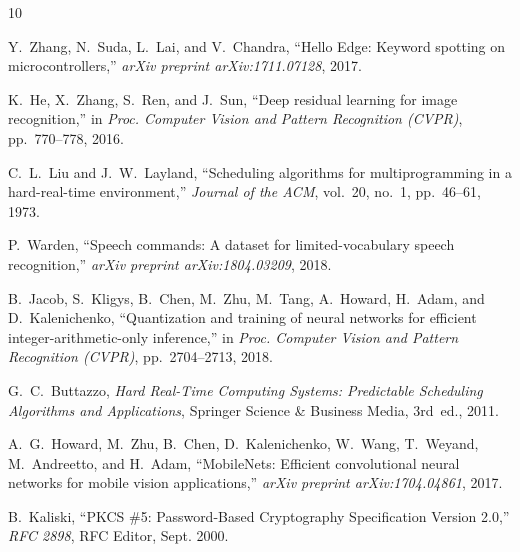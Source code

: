 \documentclass[10pt,twocolumn,letterpaper]{article}
\begin{document}
\begin{thebibliography}{10}
\small

Y.~Zhang, N.~Suda, L.~Lai, and V.~Chandra, ``Hello Edge: Keyword spotting on microcontrollers,'' \textit{arXiv preprint arXiv:1711.07128}, 2017.

K.~He, X.~Zhang, S.~Ren, and J.~Sun, ``Deep residual learning for image recognition,'' in \textit{Proc. Computer Vision and Pattern Recognition (CVPR)}, pp.~770--778, 2016.

C.~L.~Liu and J.~W.~Layland, ``Scheduling algorithms for multiprogramming in a hard-real-time environment,'' \textit{Journal of the ACM}, vol.~20, no.~1, pp.~46--61, 1973.

P.~Warden, ``Speech commands: A dataset for limited-vocabulary speech recognition,'' \textit{arXiv preprint arXiv:1804.03209}, 2018.

B.~Jacob, S.~Kligys, B.~Chen, M.~Zhu, M.~Tang, A.~Howard, H.~Adam, and D.~Kalenichenko, ``Quantization and training of neural networks for efficient integer-arithmetic-only inference,'' in \textit{Proc. Computer Vision and Pattern Recognition (CVPR)}, pp.~2704--2713, 2018.

G.~C.~Buttazzo, \textit{Hard Real-Time Computing Systems: Predictable Scheduling Algorithms and Applications}, Springer Science \& Business Media, 3rd~ed., 2011.

A.~G.~Howard, M.~Zhu, B.~Chen, D.~Kalenichenko, W.~Wang, T.~Weyand, M.~Andreetto, and H.~Adam, ``MobileNets: Efficient convolutional neural networks for mobile vision applications,'' \textit{arXiv preprint arXiv:1704.04861}, 2017.

B.~Kaliski, ``PKCS \#5: Password-Based Cryptography Specification Version 2.0,'' \textit{RFC 2898}, RFC Editor, Sept. 2000.

\end{thebibliography}
\end{document}
